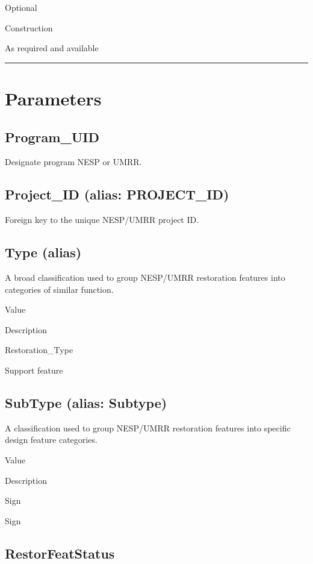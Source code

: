 \documentclass[
  letterpaper,
  DIV=11,
  numbers=noendperiod]{scrreprt}
\begin{document}
Optional

Construction

As required and available

\begin{center}\rule{0.5\linewidth}{0.5pt}\end{center}

\section{Parameters}\label{parameters-24}

\subsection{Program\_UID}\label{program_uid-24}

Designate program NESP or UMRR.

\subsection{Project\_ID (alias:
PROJECT\_ID)}\label{project_id-alias-project_id-24}

Foreign key to the unique NESP/UMRR project ID.

\subsection{Type (alias)}\label{type-alias-18}

A broad classification used to group NESP/UMRR restoration features into
categories of similar function.

Value

Description

Restoration\_Type

Support feature

\subsection{SubType (alias: Subtype)}\label{subtype-alias-subtype-24}

A classification used to group NESP/UMRR restoration features into
specific design feature categories.

Value

Description

Sign

Sign

\subsection{RestorFeatStatus}\label{restorfeatstatus-24}
\end{document}
